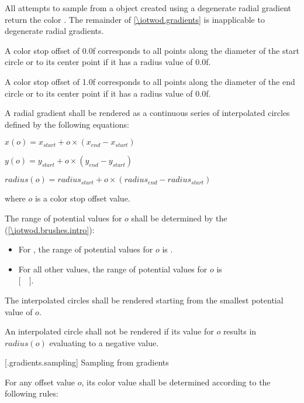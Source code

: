 \pnum
All attempts to sample from a  object created using a degenerate radial gradient return the color . The remainder of \ref{\iotwod.gradients} is inapplicable to degenerate radial gradients.

\pnum
A color stop offset of 0.0f corresponds to all points along the diameter of the start circle or to its center point if it has a radius value of 0.0f.

\pnum
A color stop offset of 1.0f corresponds to all points along the diameter of the end circle or to its center point if it has a radius value of 0.0f.

\pnum
A radial gradient shall be rendered as a continuous series of interpolated circles defined by the following equations:
\begin{enumeratea}
\item $x(o) = x_{start} + o \times (x_{end} - x_{start})$
\item $y(o) = y_{start} + o \times (y_{end} - y_{start})$
\item $radius(o) = radius_{start} + o \times (radius_{end} - radius_{start})$
\end{enumeratea}
where $o$ is a color stop offset value.

\pnum
The range of potential values for $o$ shall be determined by the  (\ref{\iotwod.brushes.intro}):
\begin{itemize}
\item For , the range of potential values for $o$ is .
\item For all other  values, the range of potential values for $o$ is\\ $[$~~$]$.
\end{itemize}

\pnum
The interpolated circles shall be rendered starting from the smallest potential value of $o$.

\pnum
An interpolated circle shall not be rendered if its value for $o$ results in $radius(o)$ evaluating to a negative value.

 [\iotwod.gradients.sampling] {Sampling from gradients}

\pnum
For any offset value $o$, its color value shall be determined according to the following rules:


